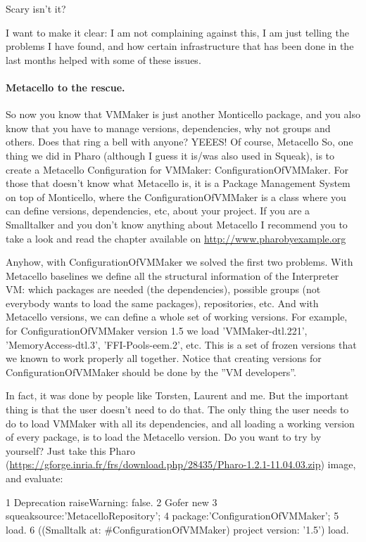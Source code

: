 \documentclass[a4paper,10pt,twoside]{book}
\begin{document}
Scary isn't it? 


I want to make it clear: I am not complaining against this, I am just telling the problems I have found, and how certain infrastructure that has been done in the last months helped with some of these issues.

\paragraph{Metacello to the rescue.}
So now you know that VMMaker is just another Monticello package, and you also know that you have to manage versions, dependencies, why not groups and others. Does that ring a bell with anyone?  YEEES! Of course, Metacello    So, one thing we did in Pharo (although I guess it is/was also used in Squeak), is to create a Metacello Configuration for VMMaker: ConfigurationOfVMMaker. For those that doesn't know what Metacello is, it is a Package Management System on top of Monticello, where the ConfigurationOfVMMaker is a class where you can define versions, dependencies, etc, about your project. If you are a Smalltalker and you don't know anything about Metacello I recommend you to take a look and read the chapter available on \url{http://www.pharobyexample.org}

Anyhow, with ConfigurationOfVMMaker we solved the first two problems. With Metacello baselines we define all the structural information of the Interpreter VM: which packages are needed (the dependencies), possible groups (not everybody wants to load the same packages), repositories, etc. And with Metacello versions, we can define a whole set of working versions. For example, for ConfigurationOfVMMaker version 1.5 we load 'VMMaker-dtl.221', 'MemoryAccess-dtl.3', 'FFI-Pools-eem.2', etc. This is a set of frozen versions that we known to work properly all together. Notice that creating versions for ConfigurationOfVMMaker should be done by the ''VM developers''. 

In fact, it was done by people like Torsten,  Laurent and me. But the important thing is that the user doesn't need to do that. The only thing the user needs to do to load VMMaker with all its dependencies, and all loading a working version of every package, is to load the Metacello version. Do you want to try by yourself?  Just take this Pharo (\url{https://gforge.inria.fr/frs/download.php/28435/Pharo-1.2.1-11.04.03.zip}) image, and evaluate:

\begin{code}{}
1 Deprecation raiseWarning: false.
2 Gofer new
3    squeaksource:'MetacelloRepository';
4    package:'ConfigurationOfVMMaker';
5    load.
6 ((Smalltalk at: #ConfigurationOfVMMaker) project version: '1.5') load.
\end{code}
\end{document}
